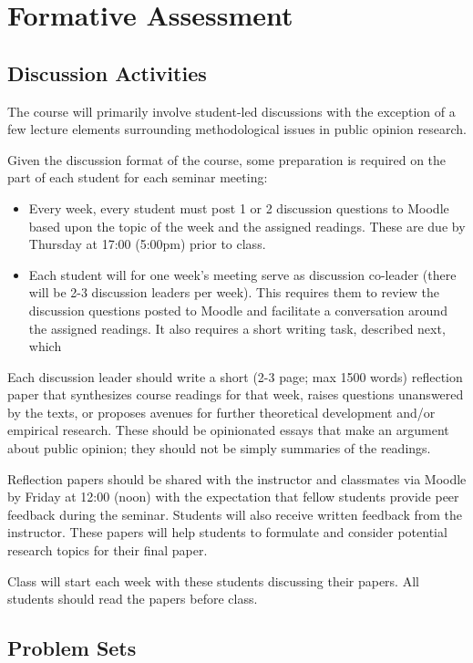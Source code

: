 \documentclass[12pt,a4paper]{article}
\begin{document}
\section{Formative Assessment}

\subsection{Discussion Activities}

The course will primarily involve student-led discussions with the exception of a few lecture elements surrounding methodological issues in public opinion research.

Given the discussion format of the course, some preparation is required on the part of each student for each seminar meeting:

\begin{itemize}
\item Every week, every student must post 1 or 2 discussion questions to Moodle based upon the topic of the week and the assigned readings. These are due by Thursday at 17:00 (5:00pm) prior to class.
\item Each student will for one week's meeting serve as discussion co-leader (there will be 2-3 discussion leaders per week). This requires them to review the discussion questions posted to Moodle and facilitate a conversation around the assigned readings. It also requires a short writing task, described next, which 
\end{itemize}

Each discussion leader should write a short (2-3 page; max 1500 words) reflection paper that synthesizes course readings for that week, raises questions unanswered by the texts, or proposes avenues for further theoretical development and/or empirical research. These should be opinionated essays that make an argument about public opinion; they should not be simply summaries of the readings.

Reflection papers should be shared with the instructor and classmates via Moodle by Friday at 12:00 (noon) with the expectation that fellow students provide peer feedback during the seminar. Students will also receive written feedback from the instructor. These papers will help students to formulate and consider potential research topics for their final paper.

Class will start each week with these students discussing their papers. All students should read the papers before class.

\subsection{Problem Sets}
\end{document}
